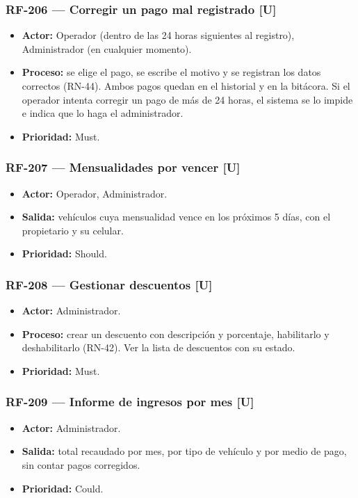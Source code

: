 \subsubsection{RF-206 — Corregir un pago mal registrado [U]}
\begin{itemize}
  \item \textbf{Actor:} Operador (dentro de las 24 horas siguientes al registro), Administrador (en cualquier momento).
  \item \textbf{Proceso:} se elige el pago, se escribe el motivo y se registran los datos correctos (RN-44). Ambos pagos quedan en el historial y en la bitácora. Si el operador intenta corregir un pago de más de 24 horas, el sistema se lo impide e indica que lo haga el administrador.
  \item \textbf{Prioridad:} Must.
\end{itemize}

\subsubsection{RF-207 — Mensualidades por vencer [U]}
\begin{itemize}
  \item \textbf{Actor:} Operador, Administrador.
  \item \textbf{Salida:} vehículos cuya mensualidad vence en los próximos 5 días, con el propietario y su celular.
  \item \textbf{Prioridad:} Should.
\end{itemize}

\subsubsection{RF-208 — Gestionar descuentos [U]}
\begin{itemize}
  \item \textbf{Actor:} Administrador.
  \item \textbf{Proceso:} crear un descuento con descripción y porcentaje, habilitarlo y deshabilitarlo (RN-42). Ver la lista de descuentos con su estado.
  \item \textbf{Prioridad:} Must.
\end{itemize}

\subsubsection{RF-209 — Informe de ingresos por mes [U]}
\begin{itemize}
  \item \textbf{Actor:} Administrador.
  \item \textbf{Salida:} total recaudado por mes, por tipo de vehículo y por medio de pago, sin contar pagos corregidos.
  \item \textbf{Prioridad:} Could.
\end{itemize}


